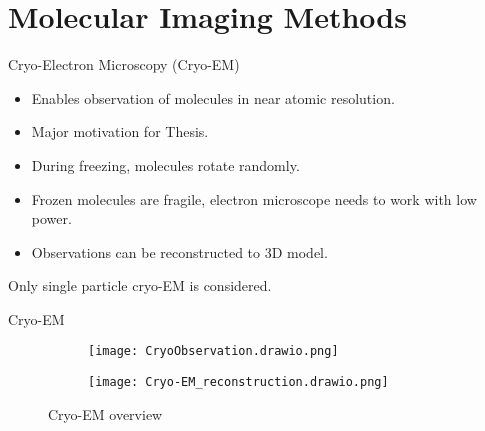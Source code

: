 
\section{Molecular Imaging Methods}	%

\begin{frame}[c]{Cryo-Electron Microscopy (Cryo-EM)}
    \begin{itemize}
        \item Enables observation of molecules in near atomic resolution.
        \item Major motivation for Thesis.
        \item During freezing, molecules rotate randomly.
        \item Frozen molecules are fragile, electron microscope needs to work with low power.
        \item Observations can be reconstructed to 3D model.
    \end{itemize}

    \begin{tcolorbox}[colback=red!5!white,hide=<-1>, alert=<2>, colframe=red!75!black]
        Only single particle cryo-EM is considered.
    \end{tcolorbox}

\end{frame}

\begin{frame}[c]{Cryo-EM}
    \begin{figure}
        \captionsetup[subfigure]{justification=centering}
        \centering
        \hfill
        \begin{subfigure}[t]{0.35\textwidth}
            \vskip 0pt
            \texttt{[image: CryoObservation.drawio.png]}
        \end{subfigure}\hfill
        \pause
        \begin{subfigure}[t]{0.4\textwidth}
            \vskip 0pt
            \texttt{[image: Cryo-EM\_reconstruction.drawio.png]}
        \end{subfigure}\hfill
        \caption{Cryo-EM overview}
    \end{figure}

\end{frame}

